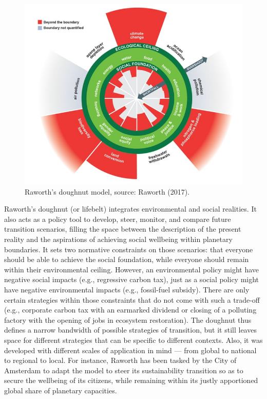 \documentclass[a4paper, nobind]{templates/ociamthesis}
\begin{document}
\begin{figure}
\includegraphics[width=1\linewidth]{./figures/raworth_doughnut} \caption[Raworth's doughnut model]{Raworth's doughnut model, source: Raworth (2017).}\label{fig:unnamed-chunk-6}
\end{figure}

Raworth's doughnut (or lifebelt) integrates environmental and social realities. It also acts as a policy tool to develop, steer, monitor, and compare future transition scenarios, filling the space between the description of the present reality and the aspirations of achieving social wellbeing within planetary boundaries. It sets two normative constraints on those scenarios: that everyone should be able to achieve the social foundation, while everyone should remain within their environmental ceiling. However, an environmental policy might have negative social impacts (e.g., regressive carbon tax), just as a social policy might have negative environmental impacts (e.g., fossil-fuel subsidy). There are only certain strategies within those constraints that do not come with such a trade-off (e.g., corporate carbon tax with an earmarked dividend or closing of a polluting factory with the opening of jobs in ecosystem restoration). The doughnut thus defines a narrow bandwidth of possible strategies of transition, but it still leaves space for different strategies that can be specific to different contexts. Also, it was developed with different scales of application in mind --- from global to national to regional to local. For instance, Raworth has been tasked by the City of Amsterdam to adapt the model to steer its sustainability transition so as to secure the wellbeing of its citizens, while remaining within its justly apportioned global share of planetary capacities.
\end{document}
